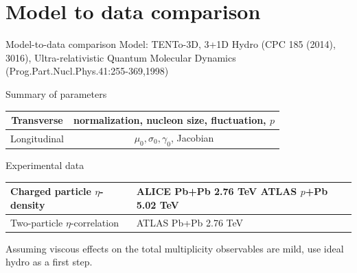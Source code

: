 \documentclass[11pt]{beamer}
\begin{document}
\section{Model to data comparison}
\begin{frame}{Model-to-data comparison}
Model: TENTo-3D, 3+1D Hydro {\tiny (CPC 185 (2014), 3016)}, Ultra-relativistic Quantum Molecular Dynamics {\tiny (Prog.Part.Nucl.Phys.41:255-369,1998)}


\begin{center}
Summary of parameters
\begin{tabular}{c|c}
\hline 
Transverse & normalization, nucleon size, fluctuation, $p$ \\ 
\hline 
Longitudinal & $\mu_0,\sigma_0, \gamma_0$, Jacobian \\ 
\hline 
\end{tabular} 
\end{center}

\begin{center}
Experimental data
\begin{tabularx}{0.8\textwidth}{p{4.5cm}|p{4cm}}
\hline
 Charged particle $\eta$-density & ALICE Pb+Pb 2.76 TeV ATLAS $p$+Pb 5.02 TeV \\ 
\hline
Two-particle $\eta$-correlation & ATLAS Pb+Pb 2.76 TeV \\
\hline
\end{tabularx}
\end{center}

Assuming viscous effects on the total multiplicity observables are mild, use ideal hydro as a first step.
\end{frame}
\end{document}
